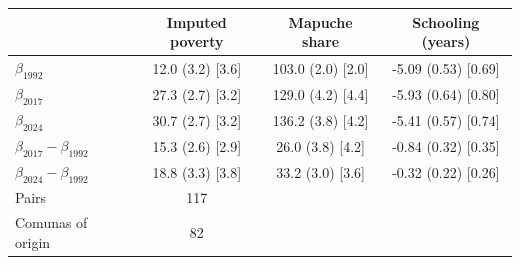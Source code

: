\begin{tabular}{lccc}
\toprule
 & Imputed poverty & Mapuche share & Schooling (years) \\
\midrule
$\beta_{1992}$ & 12.0 (3.2) [3.6] & 103.0 (2.0) [2.0] & -5.09 (0.53) [0.69] \\
$\beta_{2017}$ & 27.3 (2.7) [3.2] & 129.0 (4.2) [4.4] & -5.93 (0.64) [0.80] \\
$\beta_{2024}$ & 30.7 (2.7) [3.2] & 136.2 (3.8) [4.2] & -5.41 (0.57) [0.74] \\
\midrule
$\beta_{2017}-\beta_{1992}$ & 15.3 (2.6) [2.9] & 26.0 (3.8) [4.2] & -0.84 (0.32) [0.35] \\
$\beta_{2024}-\beta_{1992}$ & 18.8 (3.3) [3.8] & 33.2 (3.0) [3.6] & -0.32 (0.22) [0.26] \\
\midrule
Pairs & 117 & & \\
Comunas of origin & 82 & & \\
\bottomrule
\end{tabular}
